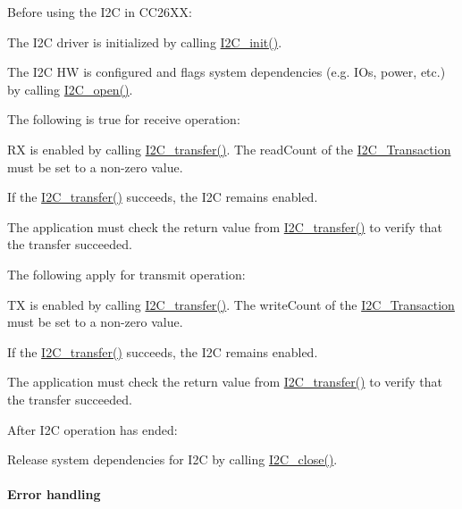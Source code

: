 Before using the I2\+C in C\+C26\+X\+X\+:
\begin{DoxyItemize}
\item The I2\+C driver is initialized by calling \hyperlink{_i2_c_8h_a9ff51ddf1d325776fef90cce0223772b}{I2\+C\+\_\+init()}.
\item The I2\+C H\+W is configured and flags system dependencies (e.\+g. I\+Os, power, etc.) by calling \hyperlink{_i2_c_8h_ae1aa99e1fee4517406018e10025cca0e}{I2\+C\+\_\+open()}.
\end{DoxyItemize}The following is true for receive operation\+:
\begin{DoxyItemize}
\item R\+X is enabled by calling \hyperlink{_i2_c_8h_ac5d827b67fe77d7d179026941cc069d7}{I2\+C\+\_\+transfer()}. The read\+Count of the \hyperlink{struct_i2_c___transaction}{I2\+C\+\_\+\+Transaction} must be set to a non-\/zero value.
\item If the \hyperlink{_i2_c_8h_ac5d827b67fe77d7d179026941cc069d7}{I2\+C\+\_\+transfer()} succeeds, the I2\+C remains enabled.
\item The application must check the return value from \hyperlink{_i2_c_8h_ac5d827b67fe77d7d179026941cc069d7}{I2\+C\+\_\+transfer()} to verify that the transfer succeeded.
\end{DoxyItemize}The following apply for transmit operation\+:
\begin{DoxyItemize}
\item T\+X is enabled by calling \hyperlink{_i2_c_8h_ac5d827b67fe77d7d179026941cc069d7}{I2\+C\+\_\+transfer()}. The write\+Count of the \hyperlink{struct_i2_c___transaction}{I2\+C\+\_\+\+Transaction} must be set to a non-\/zero value.
\item If the \hyperlink{_i2_c_8h_ac5d827b67fe77d7d179026941cc069d7}{I2\+C\+\_\+transfer()} succeeds, the I2\+C remains enabled.
\item The application must check the return value from \hyperlink{_i2_c_8h_ac5d827b67fe77d7d179026941cc069d7}{I2\+C\+\_\+transfer()} to verify that the transfer succeeded.
\end{DoxyItemize}After I2\+C operation has ended\+:
\begin{DoxyItemize}
\item Release system dependencies for I2\+C by calling \hyperlink{_i2_c_8h_a12c86d89a687f2ee1eb980d99c32326d}{I2\+C\+\_\+close()}.
\end{DoxyItemize}

\paragraph*{Error handling}


